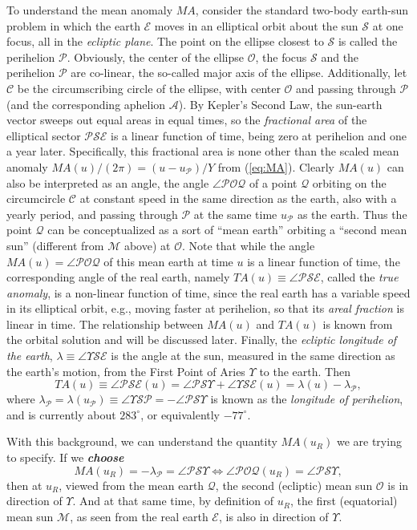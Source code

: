\documentclass[]{AGUJournal}
\newcommand{\beq}{\begin{equation}}
\newcommand{\eeq}{\end{equation}}
\newcommand{\earth}{{\mathcal{E}}}
\newcommand{\sun}{{\mathcal{S}}}
\newcommand{\mqsun}{{\mathcal{M}}}
\newcommand{\mearth}{{\mathcal{Q}}}
\renewcommand{\center}{{\mathcal{O}}}
\newcommand{\peri}{{\mathcal{P}}}
\newcommand{\aphe}{{\mathcal{A}}}
\newcommand{\fpoa}{\Upsilon}
\newcommand{\la}{\lambda}
\newcommand{\MA}{M\!A}
\newcommand{\TA}{T\!A}
\renewcommand{\circle}{{\mathcal{C}}}
\begin{document}
To understand the mean anomaly $\MA$, consider the standard two-body earth-sun problem in which the earth $\earth$ moves in an elliptical 
orbit about the sun $\sun$ at one focus, all in the {\em ecliptic plane}. The point on the ellipse closest to $\sun$ is called the perihelion $\peri$. 
Obviously, the center of the ellipse $\center$, the focus $\sun$ and the perihelion $\peri$ are co-linear, the so-called major axis of the ellipse. 
Additionally, let $\circle$ be the circumscribing circle of the ellipse, with center $\center$ and passing through $\peri$ (and the corresponding 
aphelion $\aphe$). By Kepler's Second Law, the sun-earth vector sweeps out equal areas in equal times, so the {\em fractional area\/} of the 
elliptical sector $\peri\sun\earth$ is a linear function of time, being zero at perihelion and one a year later. Specifically, this fractional area is 
none other than the scaled mean anomaly $\MA(u) / (2\pi) = (u - u_\peri) / Y$ from (\ref{eq:MA}). Clearly $\MA(u)$ can also be interpreted as 
an angle, the angle $\angle\peri\center\mearth$ of a point $\mearth$ orbiting on the circumcircle $\circle$ at constant speed in the same direction 
as the earth, also with a yearly period, and passing through $\peri$ at the same time $u_\peri$ as the earth. Thus the point $\mearth$ can be 
conceptualized as a sort of ``mean earth'' orbiting a ``second mean sun'' (different from $\mqsun$ above) at $\center$. Note that while the 
angle $\MA(u) = \angle\peri\center\mearth$ of this mean earth at time $u$ is a linear function of time, the corresponding angle of the real earth, 
namely $\TA(u) \equiv \angle\peri\sun\earth$, called the {\em true anomaly}, is a non-linear function of time, since the real earth has a variable 
speed in its elliptical orbit, e.g., moving faster at perihelion, so that its {\em areal fraction\/} is linear in time. The relationship between $\MA(u)$ 
and $\TA(u)$ is known from the orbital solution and will be discussed later. Finally, the {\em ecliptic longitude of the earth}, 
$\la \equiv \angle\fpoa\sun\earth$ is the angle at the sun, measured in the same direction as the earth's motion, from the 
First Point of Aries $\fpoa$ to the earth. Then
\beq
\TA(u) \equiv \angle\peri\sun\earth(u) =  \angle\peri\sun\fpoa +  \angle\fpoa\sun\earth(u) = \la(u) - \la_\peri,
\eeq
where $\la_\peri = \la(u_\peri) \equiv \angle\fpoa\sun\peri = -\angle\peri\sun\fpoa$ is known as the {\em longitude of perihelion}, and is currently about
$283^\circ$, or equivalently $-77^\circ$.

With this background, we can understand the quantity $\MA(u_R)$ we are trying to specify. If we \textbf{\textit{choose}}
\beq
\MA(u_R) = - \la_\peri = \angle\peri\sun\fpoa \iff \angle\peri\center\mearth(u_R) = \angle\peri\sun\fpoa,
\label{eq:uR-choice}
\eeq
then at $u_R$, viewed from the mean earth $\mearth$, the second (ecliptic) mean sun $\center$ is in direction of $\fpoa$.
And at that same time, by definition of $u_R$, the first (equatorial) mean sun $\mqsun$, as seen from the real earth $\earth$,
is also in direction of $\fpoa$.
\end{document}
